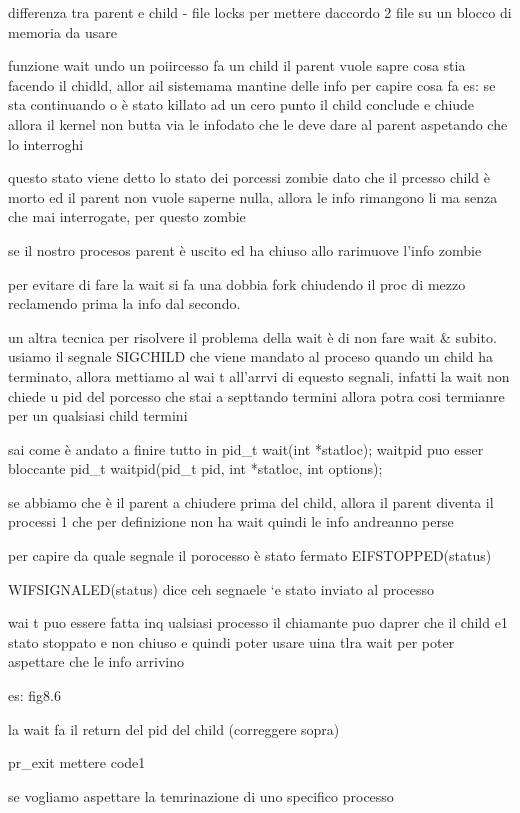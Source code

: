 differenza tra parent e child
- file locks per mettere daccordo 2 file su un blocco di memoria da usare


funzione wait
	undo un poiircesso fa un child il parent vuole sapre cosa stia facendo il chidld, allor ail sistemama mantine delle info per capire cosa fa es: se sta continuando o è stato killato ad un cero punto il child conclude e chiude allora il kernel non butta via le infodato che le deve dare al parent aspetando che lo interroghi

questo stato viene detto lo stato dei porcessi zombie dato che il prcesso child è morto ed il parent non vuole saperne nulla, allora le info rimangono li ma senza che mai interrogate, per questo zombie

se il nostro procesos parent è uscito ed ha chiuso allo rarimuove l'info zombie 

per evitare di fare la wait si fa una dobbia fork chiudendo il proc di mezzo reclamendo prima la info dal secondo.

un altra tecnica per risolvere il problema della wait è di non fare wait & subito. usiamo il segnale SIGCHILD che viene mandato al proceso quando un child ha terminato, allora mettiamo al wai t all'arrvi di equesto segnali, infatti la wait non chiede u pid del porcesso che stai a septtando termini allora potra cosi termianre per un qualsiasi child termini 

sai come è andato a finire tutto in 
pid_t wait(int *statloc);
waitpid puo esser bloccante 
pid_t waitpid(pid_t pid, int *statloc, int options);


se abbiamo che è il parent a chiudere prima del child, allora il parent diventa il processi 1 che per definizione non ha wait quindi le info andreanno perse

 per capire da quale segnale il porocesso è stato fermato EIFSTOPPED(status)

 WIFSIGNALED(status) dice ceh segnaele `e stato inviato al processo

 wai t puo essere fatta inq ualsiasi processo il chiamante puo daprer che il child e1 stato stoppato e non chiuso e quindi poter usare uina tlra wait per poter aspettare che le info arrivino


 es:
 fig8.6

 la wait fa il return del pid del child (correggere sopra)

 pr_exit mettere code1


 se vogliamo aspettare la temrinazione di uno specifico processo

